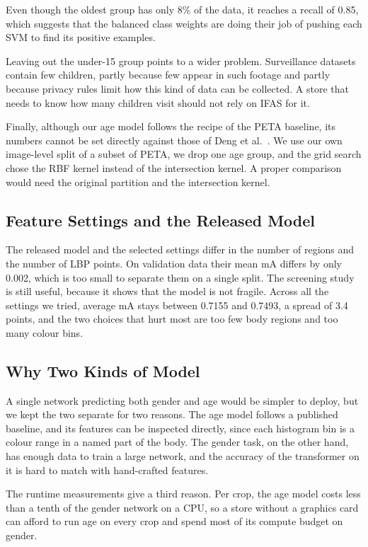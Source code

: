 \documentclass[conference]{IEEEtran}
\newcommand{\mA}{\mathrm{mA}}
\begin{document}
Even though the oldest group has only 8\% of the data, it reaches a recall of 0.85,
which suggests that the balanced class weights are doing their job of pushing each
SVM to find its positive examples.

Leaving out the under-15 group points to a wider problem. Surveillance datasets
contain few children, partly because few appear in such footage and partly
because privacy rules limit how this kind of data can be collected. A store that
needs to know how many children visit should not rely on IFAS for it.

Finally, although our age model follows the recipe of the PETA baseline, its
numbers cannot be set directly against those of Deng et al.~\cite{deng2014peta}.
We use our own image-level split of a subset of PETA, we drop one age group, and
the grid search chose the RBF kernel instead of the intersection kernel. A proper
comparison would need the original partition and the intersection kernel.

\subsection{Feature Settings and the Released Model}
The released model and the selected settings differ in the number of regions and
the number of LBP points. On validation data their mean $\mA$ differs by only
0.002, which is too small to separate them on a single split. The screening study
is still useful, because it shows that the model is not fragile. Across all the
settings we tried, average $\mA$ stays between 0.7155 and 0.7493, a spread of 3.4
points, and the two choices that hurt most are too few body regions and too many
colour bins.

\subsection{Why Two Kinds of Model}
A single network predicting both gender and age would be simpler to deploy, but we
kept the two separate for two reasons. The age model follows a published baseline,
and its features can be inspected directly, since each histogram bin is a colour
range in a named part of the body. The gender task, on the other hand, has enough
data to train a large network, and the accuracy of the transformer on it is hard to
match with hand-crafted features.

The runtime measurements give a third reason. Per crop, the age model costs less
than a tenth of the gender network on a CPU, so a store without a graphics card can
afford to run age on every crop and spend most of its compute budget on gender.
\end{document}
